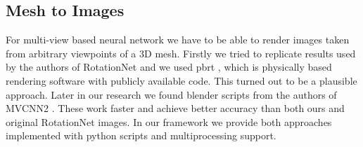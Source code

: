 \subsection{Mesh to Images}
For multi-view based neural network we have to be able to render images taken from arbitrary viewpoints of a 3D mesh. Firstly we tried to replicate results used by the authors of RotationNet \cite{kanezaki_rotationnet:_2016} and we used pbrt \cite{pharr_physically_2010}, which is physically based rendering software with publicly available code. This turned out to be a plausible approach. 
Later in our research we found blender scripts from the authors of MVCNN2 \cite{su_deeper_2018}. These work faster and achieve better accuracy than both ours and original RotationNet images. In our framework we provide both approaches implemented with python scripts and multiprocessing support. 

